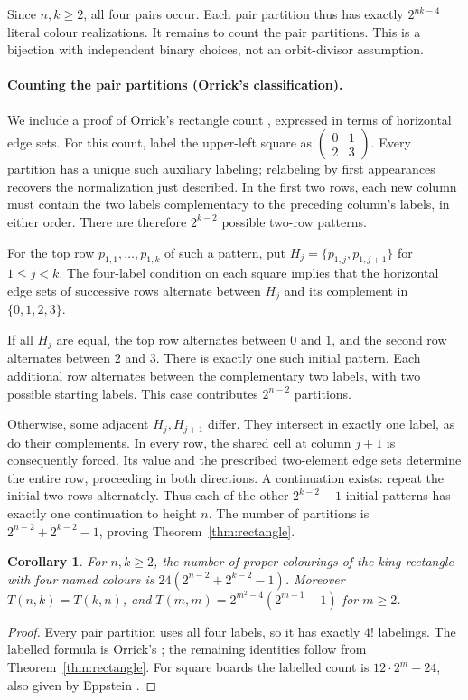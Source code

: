 \documentclass[11pt]{article}
\newtheorem{corollary}[theorem]{Corollary}
\begin{document}
Since $n,k\geq2$, all four pairs occur. Each pair partition thus has
exactly $2^{nk-4}$ literal colour realizations. It remains to count the
pair partitions. This is a bijection with independent binary choices,
not an orbit-divisor assumption.

\paragraph{Counting the pair partitions (Orrick's classification).}
We include a proof of Orrick's rectangle count \cite{orrick}, expressed
in terms of horizontal edge sets.
For this count, label the upper-left square as
$\left(\begin{smallmatrix}0&1\\2&3\end{smallmatrix}\right)$.
Every partition has a unique such auxiliary labeling; relabeling by first
appearances recovers the normalization just described.
In the first two rows, each new column must contain the two labels
complementary to the preceding column's labels, in either order.
There are therefore $2^{k-2}$ possible two-row patterns.

For the top row $p_{1,1},\ldots,p_{1,k}$ of such a pattern, put
$H_j=\{p_{1,j},p_{1,j+1}\}$ for $1\leq j<k$.
The four-label condition on each square implies that the horizontal
edge sets of successive rows alternate between $H_j$ and its complement
in $\{0,1,2,3\}$.

If all $H_j$ are equal, the top row alternates between $0$ and $1$,
and the second row alternates between $2$ and $3$.
There is exactly one such initial pattern. Each additional row alternates
between the complementary two labels, with two possible starting labels.
This case contributes $2^{n-2}$ partitions.

Otherwise, some adjacent $H_j,H_{j+1}$ differ. They intersect in
exactly one label, as do their complements. In every row, the shared cell
at column $j+1$ is consequently forced. Its value and the prescribed
two-element edge sets determine the entire row, proceeding in both
directions. A continuation exists: repeat the initial two rows
alternately. Thus each of the other $2^{k-2}-1$ initial patterns has
exactly one continuation to height $n$.
The number of partitions is
$2^{n-2}+2^{k-2}-1$, proving Theorem~\ref{thm:rectangle}.

\begin{corollary}\label{cor:labelled}
For $n,k\geq2$, the number of proper colourings of the king rectangle
with four named colours is $24(2^{n-2}+2^{k-2}-1)$.
Moreover $T(n,k)=T(k,n)$, and
$T(m,m)=2^{m^2-4}(2^{m-1}-1)$ for $m\geq2$.
\end{corollary}
\begin{proof}
Every pair partition uses all four labels, so it has exactly $4!$
labelings. The labelled formula is Orrick's \cite{orrick};
the remaining identities follow from Theorem~\ref{thm:rectangle}.
For square boards the labelled count is $12\cdot2^m-24$,
also given by Eppstein \cite{eppstein}.
\end{proof}
\end{document}
